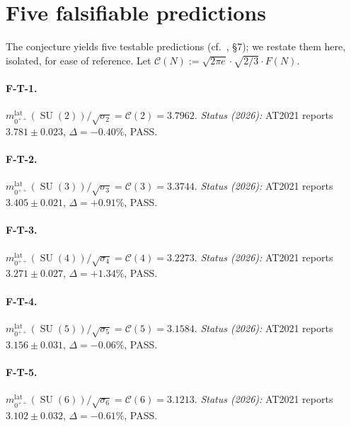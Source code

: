 \documentclass[11pt,a4paper,reqno]{amsart}
\theoremstyle{definition}
\DeclareMathOperator{\SU}{SU}
\begin{document}
\section{Five falsifiable predictions}\label{sec:falsif}

The conjecture yields five testable predictions (cf.\ \cite{Remondiere2026RouteB}, \S 7); we restate them here, isolated, for ease of reference. Let $\mathcal{C}(N) := \sqrt{2\pi e}\cdot\sqrt{2/3}\cdot F(N)$.

\paragraph{F-T-1.} $m_{0^{++}}^{\mathrm{lat}}(\SU(2))/\sqrt{\sigma_2} = \mathcal{C}(2) = 3.7962$. \emph{Status (2026):} AT2021 reports $3.781 \pm 0.023$, $\Delta = -0.40\%$, PASS.

\paragraph{F-T-2.} $m_{0^{++}}^{\mathrm{lat}}(\SU(3))/\sqrt{\sigma_3} = \mathcal{C}(3) = 3.3744$. \emph{Status (2026):} AT2021 reports $3.405 \pm 0.021$, $\Delta = +0.91\%$, PASS.

\paragraph{F-T-3.} $m_{0^{++}}^{\mathrm{lat}}(\SU(4))/\sqrt{\sigma_4} = \mathcal{C}(4) = 3.2273$. \emph{Status (2026):} AT2021 reports $3.271 \pm 0.027$, $\Delta = +1.34\%$, PASS.

\paragraph{F-T-4.} $m_{0^{++}}^{\mathrm{lat}}(\SU(5))/\sqrt{\sigma_5} = \mathcal{C}(5) = 3.1584$. \emph{Status (2026):} AT2021 reports $3.156 \pm 0.031$, $\Delta = -0.06\%$, PASS.

\paragraph{F-T-5.} $m_{0^{++}}^{\mathrm{lat}}(\SU(6))/\sqrt{\sigma_6} = \mathcal{C}(6) = 3.1213$. \emph{Status (2026):} AT2021 reports $3.102 \pm 0.032$, $\Delta = -0.61\%$, PASS.

\smallskip
\end{document}
